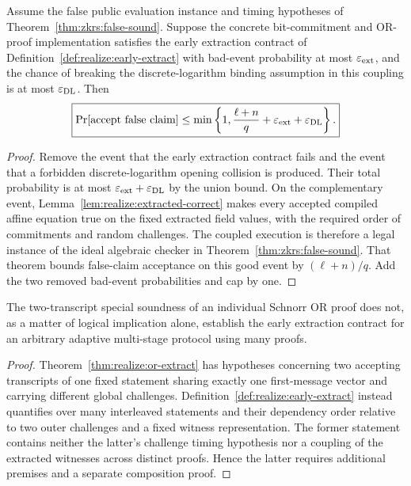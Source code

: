 \begin{theorem}\label{thm:realize:outer-sound}
Assume the false public evaluation
instance and timing hypotheses of
Theorem~\ref{thm:zkrs:false-sound}.
Suppose the concrete bit-commitment
and OR-proof implementation satisfies
the early extraction contract of
Definition~\ref{def:realize:early-extract}
with bad-event probability at most
$\varepsilon_{\rm ext}$, and the chance
of breaking the discrete-logarithm
binding assumption in this coupling is
at most $\varepsilon_{\rm DL}$.
Then
\[
 \boxed{\Pr[\mathrm{accept\ false\ claim}]
 \leq\min\left\{1,\frac{\ell+n}{q}
                   +\varepsilon_{\rm ext}
                   +\varepsilon_{\rm DL}\right\}.}
\]
\end{theorem}
\begin{proof}
Remove the event that the early
extraction contract fails and the
event that a forbidden
discrete-logarithm opening collision
is produced. Their total probability
is at most
$\varepsilon_{\rm ext}+\varepsilon_{\rm DL}$
by the union bound.
On the complementary event,
Lemma~\ref{lem:realize:extracted-correct}
makes every accepted compiled
affine equation true on the fixed
extracted field values, with the
required order of commitments and
random challenges.
The coupled execution is therefore
a legal instance of the ideal
algebraic checker in
Theorem~\ref{thm:zkrs:false-sound}.
That theorem bounds false-claim
acceptance on this good event
by $(\ell+n)/q$.
Add the two removed bad-event
probabilities and cap by one.
\end{proof}

\begin{lemma}\label{lem:realize:extract-needs-proof}
The two-transcript special soundness
of an individual Schnorr OR proof
does not, as a matter of logical
implication alone, establish the
early extraction contract for
an arbitrary adaptive multi-stage
protocol using many proofs.
\end{lemma}
\begin{proof}
Theorem~\ref{thm:realize:or-extract}
has hypotheses concerning two
accepting transcripts of one fixed
statement sharing exactly one
first-message vector and carrying
different global challenges.
Definition~\ref{def:realize:early-extract}
instead quantifies over many
interleaved statements and their
dependency order relative to
two outer challenges and a fixed
witness representation.
The former statement contains
neither the latter's challenge
timing hypothesis nor a coupling
of the extracted witnesses across
distinct proofs. Hence the latter
requires additional premises and
a separate composition proof.
\end{proof}

